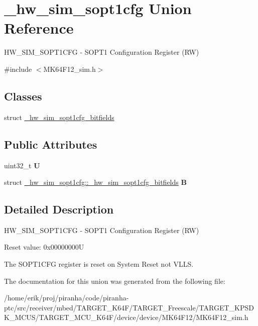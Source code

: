 \hypertarget{union__hw__sim__sopt1cfg}{}\section{\+\_\+hw\+\_\+sim\+\_\+sopt1cfg Union Reference}
\label{union__hw__sim__sopt1cfg}


H\+W\+\_\+\+S\+I\+M\+\_\+\+S\+O\+P\+T1\+C\+FG -\/ S\+O\+P\+T1 Configuration Register (RW)  




{\ttfamily \#include $<$M\+K64\+F12\+\_\+sim.\+h$>$}

\subsection*{Classes}
\begin{DoxyCompactItemize}
\item 
struct \hyperlink{struct__hw__sim__sopt1cfg_1_1__hw__sim__sopt1cfg__bitfields}{\+\_\+hw\+\_\+sim\+\_\+sopt1cfg\+\_\+bitfields}
\end{DoxyCompactItemize}
\subsection*{Public Attributes}
\begin{DoxyCompactItemize}
\item 
uint32\+\_\+t {\bfseries U}\hypertarget{union__hw__sim__sopt1cfg_a7fde3256b2c679a997ff2c8c0b74516e}{}\label{union__hw__sim__sopt1cfg_a7fde3256b2c679a997ff2c8c0b74516e}

\item 
struct \hyperlink{struct__hw__sim__sopt1cfg_1_1__hw__sim__sopt1cfg__bitfields}{\+\_\+hw\+\_\+sim\+\_\+sopt1cfg\+::\+\_\+hw\+\_\+sim\+\_\+sopt1cfg\+\_\+bitfields} {\bfseries B}\hypertarget{union__hw__sim__sopt1cfg_af326a802d4100e2a103bad6ea48195aa}{}\label{union__hw__sim__sopt1cfg_af326a802d4100e2a103bad6ea48195aa}

\end{DoxyCompactItemize}


\subsection{Detailed Description}
H\+W\+\_\+\+S\+I\+M\+\_\+\+S\+O\+P\+T1\+C\+FG -\/ S\+O\+P\+T1 Configuration Register (RW) 

Reset value\+: 0x00000000U

The S\+O\+P\+T1\+C\+FG register is reset on System Reset not V\+L\+LS. 

The documentation for this union was generated from the following file\+:\begin{DoxyCompactItemize}
\item 
/home/erik/proj/piranha/code/piranha-\/ptc/src/receiver/mbed/\+T\+A\+R\+G\+E\+T\+\_\+\+K64\+F/\+T\+A\+R\+G\+E\+T\+\_\+\+Freescale/\+T\+A\+R\+G\+E\+T\+\_\+\+K\+P\+S\+D\+K\+\_\+\+M\+C\+U\+S/\+T\+A\+R\+G\+E\+T\+\_\+\+M\+C\+U\+\_\+\+K64\+F/device/device/\+M\+K64\+F12/M\+K64\+F12\+\_\+sim.\+h\end{DoxyCompactItemize}

